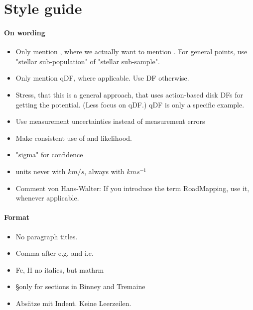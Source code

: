 \section{Style guide}

\paragraph{On wording}
\begin{itemize}
\item Only mention \MAP{}, where we actually want to mention \MAPs{}. For general points, use "stellar sub-population" of "stellar sub-sample".
\item Only mention qDF, where applicable. Use DF otherwise.
\item Stress, that this is a general approach, that uses action-based disk DFs for getting the potential. (Less focus on qDF.) qDF is only a specific example.
\item Use measurement uncertainties instead of measurement errors
\item Make consistent use of \pdf{} and likelihood.
\item "sigma" for confidence
\item units never with $km/s$, always with $km s^{-1}$
\item Comment von Hans-Walter: If you introduce the term RoadMapping, use it, whenever applicable.
\end{itemize}

\paragraph{Format}
\begin{itemize}
\item No paragraph titles.
\item Comma after e.g. and i.e.
\item Fe, H no italics, but  mathrm
\item \S only for sections in Binney and Tremaine
\item Absätze mit Indent. Keine Leerzeilen.
\end{itemize}